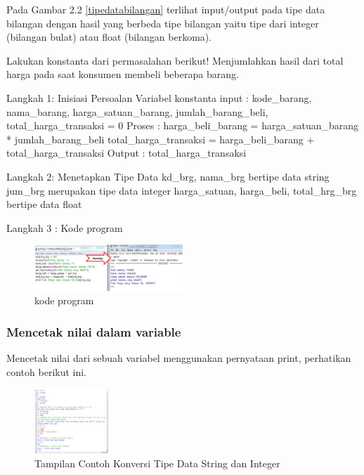 Pada Gambar 2.2 \ref{tipedatabilangan} terlihat input/output pada tipe data bilangan dengan hasil yang berbeda tipe bilangan yaitu tipe dari integer (bilangan bulat) atau float (bilangan berkoma).\cite{irfani2016bahan}

Lakukan konstanta dari permasalahan berikut! Menjumlahkan hasil dari total harga pada saat konsumen membeli beberapa barang.

Langkah 1: Inisiasi Persoalan 
Variabel konstanta input :  
kode\_barang, nama\_barang, harga\_satuan\_barang, 
jumlah\_barang\_beli, total\_harga\_transaksi = 0 
Proses :  harga\_beli\_barang = harga\_satuan\_barang * jumlah\_barang\_beli 
total\_harga\_transaksi = harga\_beli\_barang + total\_harga\_transaksi
Output :  total\_harga\_transaksi

Langkah 2: Menetapkan Tipe Data 
kd\_brg, nama\_brg bertipe data string 
jum\_brg merupakan tipe data integer harga\_satuan, harga\_beli, total\_hrg\_brg bertipe data float 

Langkah 3 : Kode program
\begin{figure}[ht]
    \centerline{\includegraphics[width=0.50\textwidth]{figures/code.png}}
    \caption{kode program}
    \label{code}
    \end{figure}
  
\subsubsection{Mencetak nilai dalam variable} 
Mencetak nilai dari sebuah variabel menggunakan pernyataan print, perhatikan 
contoh berikut ini. 
\begin{figure}[ht]
    \centerline{\includegraphics[width=0.25\textwidth]{figures/konversi.png}}
    \caption{Tampilan Contoh Konversi Tipe Data String dan Integer}
    \label{Tipe Data String dan Integer}
    \end{figure}

